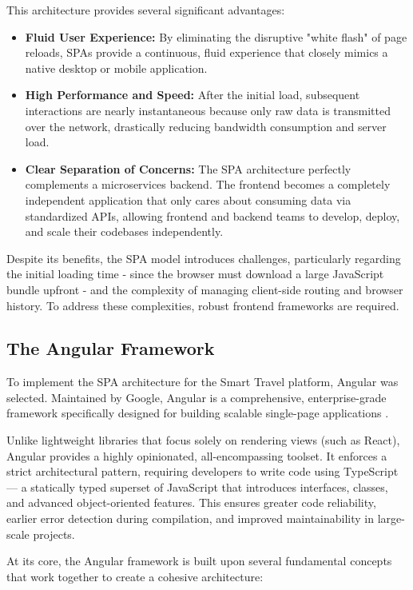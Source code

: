 This architecture provides several significant advantages:
\begin{itemize}
    \item \textbf{Fluid User Experience:} By eliminating the disruptive "white flash" of page reloads, \gls{SPA}s provide a continuous, fluid experience that closely mimics a native desktop or mobile application.
    \item \textbf{High Performance and Speed:} After the initial load, subsequent interactions are nearly instantaneous because only raw data is transmitted over the network, drastically reducing bandwidth consumption and server load.
    \item \textbf{Clear Separation of Concerns:} The \gls{SPA} architecture perfectly complements a microservices backend. The frontend becomes a completely independent application that only cares about consuming data via standardized APIs, allowing frontend and backend teams to develop, deploy, and scale their codebases independently.
\end{itemize}

Despite its benefits, the \gls{SPA} model introduces challenges, particularly regarding the initial loading time - since the browser must download a large JavaScript bundle upfront - and the complexity of managing client-side routing and browser history. To address these complexities, robust frontend frameworks are required.

\subsection{The Angular Framework}

To implement the \gls{SPA} architecture for the Smart Travel platform, Angular was selected. Maintained by Google, Angular is a comprehensive, enterprise-grade framework specifically designed for building scalable single-page applications \cite{angular_dev_overview}. 

Unlike lightweight libraries that focus solely on rendering views (such as React), Angular provides a highly opinionated, all-encompassing toolset. It enforces a strict architectural pattern, requiring developers to write code using TypeScript — a statically typed superset of JavaScript that introduces interfaces, classes, and advanced object-oriented features. This ensures greater code reliability, earlier error detection during compilation, and improved maintainability in large-scale projects.

At its core, the Angular framework is built upon several fundamental concepts that work together to create a cohesive architecture:

